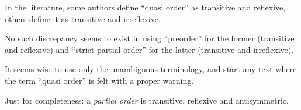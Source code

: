 \documentclass[12pt]{article}
\begin{document}
In the literature, some authors define ``quasi order'' as transitive and reflexive, others define it as transitive and irreflexive.

No such discrepancy seems to exist in using ``preorder'' for the former (transitive and reflexive) and ``strict partial order'' for the latter (transitive and irreflexive).

It seems wise to use only the unambiguous terminology, and start any text where the term ``quasi order'' is felt  with a proper warning.

Just for completeness: a {\em partial order} is transitive, reflexive and antisymmetric.
\end{document}
